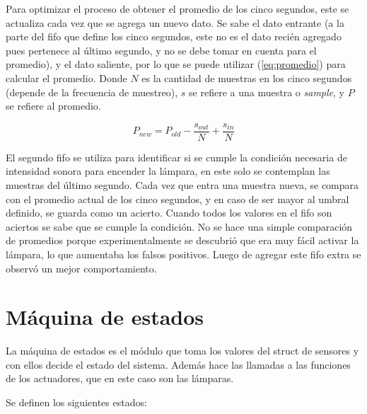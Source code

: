 Para optimizar el proceso de obtener el promedio de los cinco segundos, este se
actualiza cada vez que se agrega un nuevo dato. Se sabe el dato entrante (a la parte del fifo que
define los cinco segundos, este no es el dato recién agregado pues pertenece al último segundo, y
no se debe tomar en cuenta para el promedio), y el dato saliente, por lo que se puede utilizar
(\ref{eq:promedio}) para calcular el promedio. Donde $N$ es la cantidad de muestras en los cinco
segundos (depende de la frecuencia de muestreo), $s$ se refiere a una muestra o \textit{sample}, y
$P$ se refiere al promedio.

\begin{equation}
  P_{new} = P_{old}-\frac{s_{out}}{N}+\frac{s_{in}}{N}
\end{equation}

El segundo fifo se utiliza para identificar si se cumple la condición necesaria de intensidad sonora
para encender la lámpara, en este solo se contemplan las muestras del último segundo.  Cada vez que
entra una muestra nueva, se compara con el promedio actual de los cinco segundos, y en caso de ser
mayor al umbral definido, se guarda como un acierto. Cuando todos los valores en el fifo son
aciertos se sabe que se cumple la condición. No se hace una simple comparación de promedios porque
experimentalmente se descubrió que era muy fácil activar la lámpara, lo que aumentaba los falsos
positivos. Luego de agregar este fifo extra se observó un mejor comportamiento.

\section{Máquina de estados}

La máquina de estados es el módulo que toma los valores del struct de sensores y con ellos decide el
estado del sistema. Además hace las llamadas a las funciones de los actuadores, que en este caso son
las lámparas. 

Se definen los siguientes estados:

